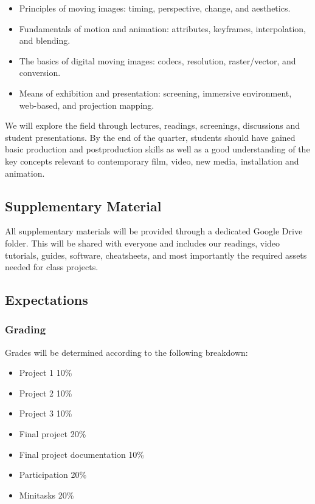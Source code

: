 \documentclass[10pt,letter,english]{article}
\begin{document}
\begin{itemize}
      \item
            Principles of moving images: timing, perspective, change, and aesthetics.
      \item
            Fundamentals of motion and animation: attributes, keyframes, interpolation, and blending.
      \item
            The basics of digital moving images: codecs, resolution, raster/vector, and conversion.
      \item
            Means of exhibition and presentation: screening, immersive environment, web-based, and projection mapping.
\end{itemize}

We will explore the field through lectures, readings, screenings, discussions and student presentations. By the end of the quarter, students should have gained basic production and postproduction skills as well as a good understanding of the key concepts relevant to contemporary film, video, new media, installation and animation.

\hypertarget{supplementary-material}{%
      \subsection{Supplementary Material}\label{supplementary-material}}

All supplementary materials will be provided through a dedicated Google Drive folder. This will be shared with everyone and includes our readings, video tutorials, guides, software, cheatsheets, and most importantly the required assets needed for class projects.

\hypertarget{expectations}{%
      \subsection{Expectations}\label{expectations}}

\hypertarget{grading}{%
      \subsubsection{Grading}\label{grading}}

Grades will be determined according to the following breakdown:

\begin{itemize}
      \item
            Project 1 10\%
      \item
            Project 2 10\%
      \item
            Project 3 10\%
      \item
            Final project 20\%
      \item
            Final project documentation 10\%
      \item
            Participation 20\%
      \item
            Minitasks 20\%
\end{itemize}
\end{document}
